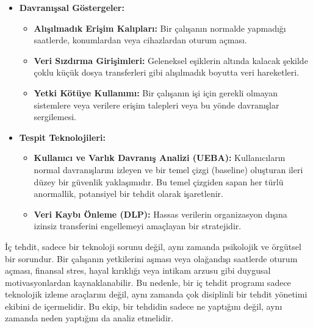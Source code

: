 \begin{itemize}
    \item \textbf{Davranışsal Göstergeler:}
    \begin{itemize}
        \item \textbf{Alışılmadık Erişim Kalıpları:} Bir çalışanın normalde yapmadığı saatlerde, konumlardan veya cihazlardan oturum açması.
        \item \textbf{Veri Sızdırma Girişimleri:} Geleneksel eşiklerin altında kalacak şekilde çoklu küçük dosya transferleri gibi alışılmadık boyutta veri hareketleri.
        \item \textbf{Yetki Kötüye Kullanımı:} Bir çalışanın işi için gerekli olmayan sistemlere veya verilere erişim talepleri veya bu yönde davranışlar sergilemesi.
    \end{itemize}
    \item \textbf{Tespit Teknolojileri:}
    \begin{itemize}
        \item \textbf{Kullanıcı ve Varlık Davranış Analizi (UEBA):} Kullanıcıların normal davranışlarını izleyen ve bir temel çizgi (baseline) oluşturan ileri düzey bir güvenlik yaklaşımıdır. Bu temel çizgiden sapan her türlü anormallik, potansiyel bir tehdit olarak işaretlenir.
        \item \textbf{Veri Kaybı Önleme (DLP):} Hassas verilerin organizasyon dışına izinsiz transferini engellemeyi amaçlayan bir stratejidir.
    \end{itemize}
\end{itemize}

İç tehdit, sadece bir teknoloji sorunu değil, aynı zamanda psikolojik ve örgütsel bir sorundur. Bir çalışanın yetkilerini aşması veya olağandışı saatlerde oturum açması, finansal stres, hayal kırıklığı veya intikam arzusu gibi duygusal motivasyonlardan kaynaklanabilir. Bu nedenle, bir iç tehdit programı sadece teknolojik izleme araçlarını değil, aynı zamanda çok disiplinli bir tehdit yönetimi ekibini de içermelidir. Bu ekip, bir tehdidin sadece ne yaptığını değil, aynı zamanda neden yaptığını da analiz etmelidir.

